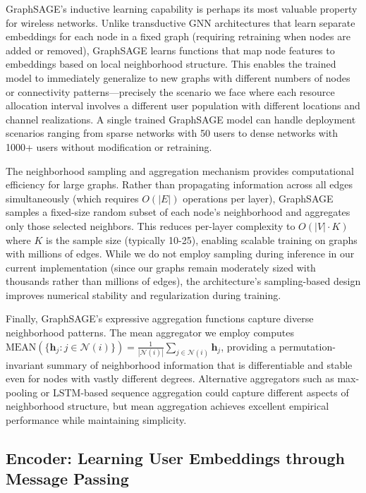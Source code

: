 GraphSAGE's inductive learning capability is perhaps its most valuable property for wireless networks. Unlike transductive GNN architectures that learn separate embeddings for each node in a fixed graph (requiring retraining when nodes are added or removed), GraphSAGE learns functions that map node features to embeddings based on local neighborhood structure. This enables the trained model to immediately generalize to new graphs with different numbers of nodes or connectivity patterns—precisely the scenario we face where each resource allocation interval involves a different user population with different locations and channel realizations. A single trained GraphSAGE model can handle deployment scenarios ranging from sparse networks with 50 users to dense networks with 1000+ users without modification or retraining.

The neighborhood sampling and aggregation mechanism provides computational efficiency for large graphs. Rather than propagating information across all edges simultaneously (which requires $O(|E|)$ operations per layer), GraphSAGE samples a fixed-size random subset of each node's neighborhood and aggregates only those selected neighbors. This reduces per-layer complexity to $O(|V| \cdot K)$ where $K$ is the sample size (typically 10-25), enabling scalable training on graphs with millions of edges. While we do not employ sampling during inference in our current implementation (since our graphs remain moderately sized with thousands rather than millions of edges), the architecture's sampling-based design improves numerical stability and regularization during training.

Finally, GraphSAGE's expressive aggregation functions capture diverse neighborhood patterns. The mean aggregator we employ computes $\text{MEAN}(\{\mathbf{h}_j : j \in \mathcal{N}(i)\}) = \frac{1}{|\mathcal{N}(i)|} \sum_{j \in \mathcal{N}(i)} \mathbf{h}_j$, providing a permutation-invariant summary of neighborhood information that is differentiable and stable even for nodes with vastly different degrees. Alternative aggregators such as max-pooling or LSTM-based sequence aggregation could capture different aspects of neighborhood structure, but mean aggregation achieves excellent empirical performance while maintaining simplicity.

\subsection{Encoder: Learning User Embeddings through Message Passing}


